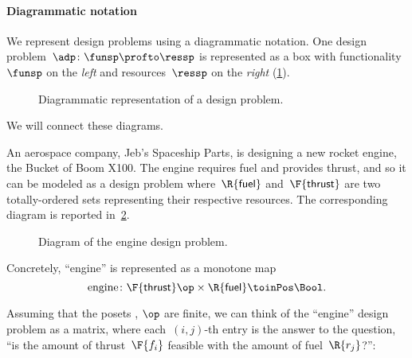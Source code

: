 \paragraph{Diagrammatic notation} We represent design problems using a diagrammatic notation. One design problem~$\adp \colon \funsp \profto \ressp$ is represented as a box with functionality~$\funsp$ on the \emph{left} and resources~$\ressp$ on the \emph{right} (\cref{fig:diagrammaticdp}).
\begin{figure}[h!]
    \begin{center}
    \end{center}
    \caption{Diagrammatic representation of a design problem. \label{fig:diagrammaticdp}}
\end{figure}
We will connect these diagrams.
\begin{example}
    An aerospace company, Jeb's Spaceship Parts, is designing a new rocket engine, the Bucket of Boom X100. The engine requires fuel and provides thrust, and so it can be modeled as a design problem where~$\R{\mathsf{fuel}}$ and~$\F{\mathsf{thrust}}$ are two totally-ordered sets representing their respective resources. The corresponding diagram is reported in~\cref{fig:enginedp}.
    \begin{figure}[h!]
        \begin{center}
        \end{center}
        \caption{Diagram of the engine design problem. \label{fig:enginedp}}
    \end{figure}

    Concretely, ``engine'' is represented as a monotone map
    \begin{equation}
        \text{engine} \colon \F{\mathsf{thrust}}\op \times \R{\mathsf{fuel}} \toinPos \Bool.
    \end{equation}

    Assuming that the posets , $\op$ are finite, we can think of the ``engine'' design problem as a matrix, where each~$(i,j)$-th entry is the answer to the question, ``is the amount of thrust~$\F{f_i}$ feasible with the amount of fuel~$\R{r_j}$?'':


\end{example}
